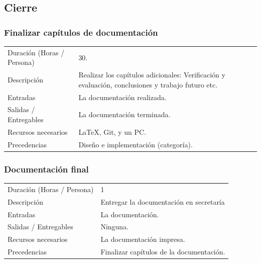 \subsection{Cierre}
\subsubsection{Finalizar cap\'{i}tulos de documentaci\'{o}n}
\begin{table}[H]
    \begin{center}
        \begin{tabular}{l p{8cm}}
            Duraci\'{o}n (Horas  / Persona)       & 30. \\ 
            Descripci\'{o}n                       & Realizar los cap\'{i}tulos adicionales: Verificaci\'{o}n y evaluaci\'{o}n, conclusiones y trabajo futuro
                                                    etc. \\
            Entradas                              & La documentaci\'{o}n realizada. \\
            Salidas / Entregables                 & La documentaci\'{o}n terminada. \\
            Recursos necesarios                   & \LaTeX, Git, y un PC. \\
            Precedencias                          & Dise\~{n}o e implementaci\'{o}n (categor\'{i}a). \\
        \end{tabular}
    \end{center}
    
\end{table}

\subsubsection{Documentaci\'{o}n final}
\begin{table}[H]
    \begin{center}
        \begin{tabular}{l p{8cm}}
            Duraci\'{o}n (Horas / Persona)        & 1 \\ 
            Descripci\'{o}n                       & Entregar la documentaci\'{o}n en secretar\'{i}a \\
            Entradas                              & La documentaci\'{o}n. \\
            Salidas / Entregables                 & Ninguna. \\
            Recursos necesarios                   & La documentaci\'{o}n impresa. \\
            Precedencias                          & Finalizar cap\'{i}tulos de la documentaci\'{o}n. \\
        \end{tabular}
    \end{center}
    
\end{table}

